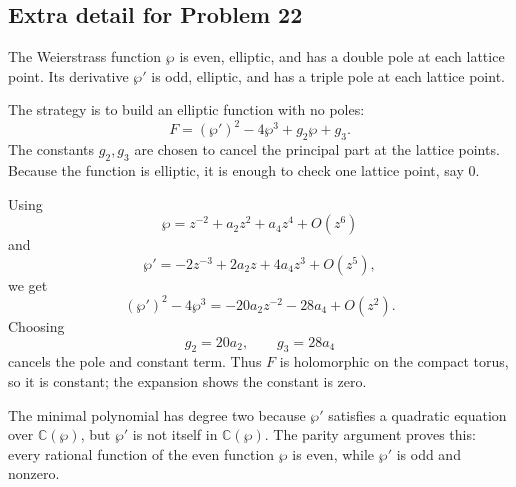 \documentclass[11pt]{article}
\newcommand{\C}{\mathbb{C}}
\begin{document}
\subsection*{Extra detail for Problem 22}

The Weierstrass function $\wp$ is even, elliptic, and has a double pole at each lattice point. Its derivative $\wp'$ is odd, elliptic, and has a triple pole at each lattice point.

The strategy is to build an elliptic function with no poles:
\[
 F=(\wp')^2-4\wp^3+g_2\wp+g_3.
\]
The constants $g_2,g_3$ are chosen to cancel the principal part at the lattice points. Because the function is elliptic, it is enough to check one lattice point, say $0$.

Using
\[
 \wp=z^{-2}+a_2z^2+a_4z^4+O(z^6)
\]
and
\[
 \wp'=-2z^{-3}+2a_2z+4a_4z^3+O(z^5),
\]
we get
\[
(\wp')^2-4\wp^3=-20a_2z^{-2}-28a_4+O(z^2).
\]
Choosing
\[
 g_2=20a_2,\qquad g_3=28a_4
\]
cancels the pole and constant term. Thus $F$ is holomorphic on the compact torus, so it is constant; the expansion shows the constant is zero.

The minimal polynomial has degree two because $\wp'$ satisfies a quadratic equation over $\C(\wp)$, but $\wp'$ is not itself in $\C(\wp)$. The parity argument proves this: every rational function of the even function $\wp$ is even, while $\wp'$ is odd and nonzero.
\end{document}
